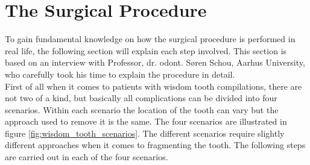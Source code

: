
\section{The Surgical Procedure}
\label{sec:surgical_procedure}
To gain fundamental knowledge on how the surgical procedure is
performed in real life, the following section will explain each step
involved. This section is based on an interview with Professor,
dr. odont. Søren Schou, Aarhus University, who carefully took his time
to explain the procedure in detail.  \\

First of all when it comes to patients with wisdom tooth compilations,
there are not two of a kind, but basically all complications can be
divided into four scenarios. Within each scenario the location of the
tooth can vary but the approach used to remove it is the same. The
four scenarios are illustrated in figure
\vref{fig:wisdom_tooth_scenarios}. The different scenarios require
slightly different approaches when it comes to fragmenting the
tooth. The following steps are carried out in each of the four
scenarios. \\



